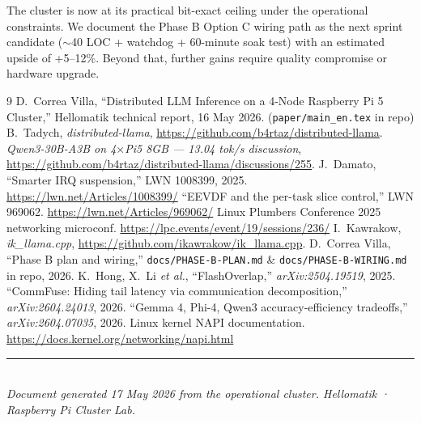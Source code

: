 \documentclass[10pt,a4paper]{article}
\begin{document}
The cluster is now at its practical bit-exact ceiling under the operational constraints. We document the Phase B Option C wiring path as the next sprint candidate ($\sim$40 LOC + watchdog + 60-minute soak test) with an estimated upside of +5--12\%. Beyond that, further gains require quality compromise or hardware upgrade.

\begin{thebibliography}{9}
\small
{} D.\ Correa Villa, ``Distributed LLM Inference on a 4-Node Raspberry Pi 5 Cluster,'' Hellomatik technical report, 16 May 2026. (\texttt{paper/main\_en.tex} in repo)
 B.\ Tadych, \emph{distributed-llama}, \url{https://github.com/b4rtaz/distributed-llama}.
 \emph{Qwen3-30B-A3B on 4$\times$Pi5 8GB --- 13.04 tok/s discussion}, \url{https://github.com/b4rtaz/distributed-llama/discussions/255}.
 J.\ Damato, ``Smarter IRQ suspension,'' LWN 1008399, 2025. \url{https://lwn.net/Articles/1008399/}
 ``EEVDF and the per-task slice control,'' LWN 969062. \url{https://lwn.net/Articles/969062/}
 Linux Plumbers Conference 2025 networking microconf. \url{https://lpc.events/event/19/sessions/236/}
 I.\ Kawrakow, \emph{ik\_llama.cpp}, \url{https://github.com/ikawrakow/ik_llama.cpp}.
 D.\ Correa Villa, ``Phase B plan and wiring,'' \texttt{docs/PHASE-B-PLAN.md} \& \texttt{docs/PHASE-B-WIRING.md} in repo, 2026.
 K.\ Hong, X.\ Li \emph{et al.}, ``FlashOverlap,'' \emph{arXiv:2504.19519}, 2025.
 ``CommFuse: Hiding tail latency via communication decomposition,'' \emph{arXiv:2604.24013}, 2026.
 ``Gemma 4, Phi-4, Qwen3 accuracy-efficiency tradeoffs,'' \emph{arXiv:2604.07035}, 2026.
 Linux kernel NAPI documentation. \url{https://docs.kernel.org/networking/napi.html}
\end{thebibliography}

\vfill
\begin{center}
\rule{0.6\textwidth}{0.4pt}\\[0.3cm]
\small\itshape Document generated 17 May 2026 from the operational cluster. Hellomatik · Raspberry Pi Cluster Lab.
\end{center}
\end{document}

